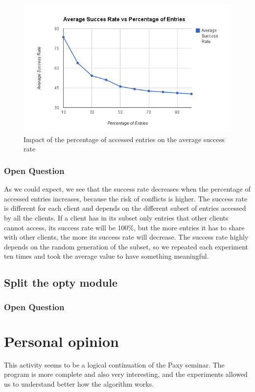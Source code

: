 \documentclass[a4paper, 11pt]{article}
\begin{document}
\begin{figure}[H]
\begin{center}
\includegraphics[scale=0.5]{exp5.png}
\caption{Impact of the percentage of accessed entries on the average success rate}
\end{center}
\end{figure}

\subsubsection{Open Question}
As we could expect, we see that the success rate decreases when the percentage of accessed entries increases, because the risk of conflicts is higher. The success rate is different for each client and depends on the different subset of entries accessed by all the clients. If a client has in its subset only entries that other clients cannot access, its success rate will be 100\%, but the more entries it has to share with other clients, the more its success rate will decrease. The success rate highly depends on the random generation of the subset, so we repeated each experiment ten times and took the average value to have something meaningful.


\subsection{Split the opty module}

\subsubsection{Open Question}

\section{Personal opinion}
This activity seems to be a logical continuation of the Paxy seminar. The program is more complete and also very interesting, and the experiments allowed us to understand better how the algorithm works.
\end{document}
